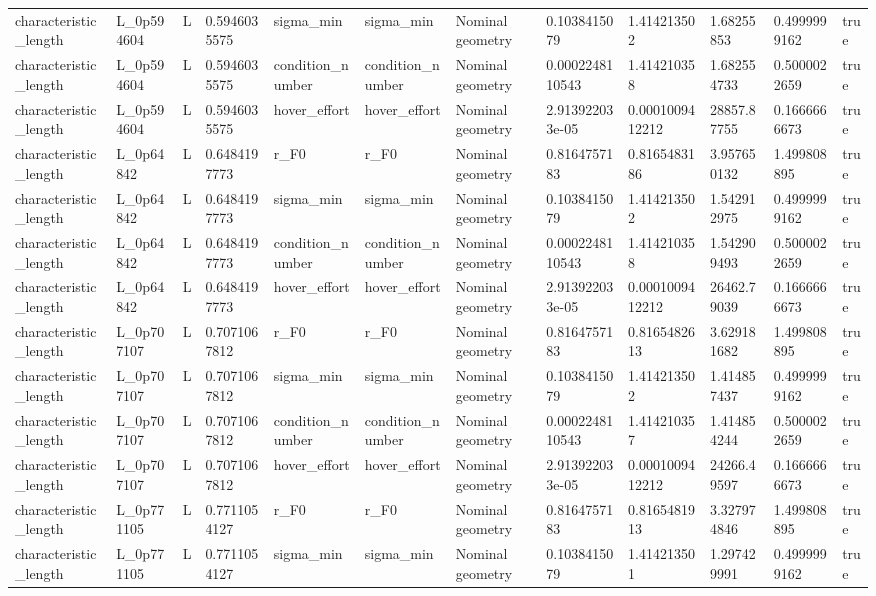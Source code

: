 \begin{tabular}{@{}llllllllllll@{}}
characteristic\_length & L\_0p594604 & L & 0.5946035575 & sigma\_min & sigma\_min & Nominal geometry & 0.1038415079 & 1.414213502 & 1.68255853 & 0.4999999162 & true \\
characteristic\_length & L\_0p594604 & L & 0.5946035575 & condition\_number & condition\_number & Nominal geometry & 0.0002248110543 & 1.414210358 & 1.682554733 & 0.5000022659 & true \\
characteristic\_length & L\_0p594604 & L & 0.5946035575 & hover\_effort & hover\_effort & Nominal geometry & 2.913922033e-05 & 0.0001009412212 & 28857.87755 & 0.1666666673 & true \\
characteristic\_length & L\_0p64842 & L & 0.6484197773 & r\_F0 & r\_F0 & Nominal geometry & 0.8164757183 & 0.8165483186 & 3.957650132 & 1.499808895 & true \\
characteristic\_length & L\_0p64842 & L & 0.6484197773 & sigma\_min & sigma\_min & Nominal geometry & 0.1038415079 & 1.414213502 & 1.542912975 & 0.4999999162 & true \\
characteristic\_length & L\_0p64842 & L & 0.6484197773 & condition\_number & condition\_number & Nominal geometry & 0.0002248110543 & 1.414210358 & 1.542909493 & 0.5000022659 & true \\
characteristic\_length & L\_0p64842 & L & 0.6484197773 & hover\_effort & hover\_effort & Nominal geometry & 2.913922033e-05 & 0.0001009412212 & 26462.79039 & 0.1666666673 & true \\
characteristic\_length & L\_0p707107 & L & 0.7071067812 & r\_F0 & r\_F0 & Nominal geometry & 0.8164757183 & 0.8165482613 & 3.629181682 & 1.499808895 & true \\
characteristic\_length & L\_0p707107 & L & 0.7071067812 & sigma\_min & sigma\_min & Nominal geometry & 0.1038415079 & 1.414213502 & 1.414857437 & 0.4999999162 & true \\
characteristic\_length & L\_0p707107 & L & 0.7071067812 & condition\_number & condition\_number & Nominal geometry & 0.0002248110543 & 1.414210357 & 1.414854244 & 0.5000022659 & true \\
characteristic\_length & L\_0p707107 & L & 0.7071067812 & hover\_effort & hover\_effort & Nominal geometry & 2.913922033e-05 & 0.0001009412212 & 24266.49597 & 0.1666666673 & true \\
characteristic\_length & L\_0p771105 & L & 0.7711054127 & r\_F0 & r\_F0 & Nominal geometry & 0.8164757183 & 0.8165481913 & 3.327974846 & 1.499808895 & true \\
characteristic\_length & L\_0p771105 & L & 0.7711054127 & sigma\_min & sigma\_min & Nominal geometry & 0.1038415079 & 1.414213501 & 1.297429991 & 0.4999999162 & true \\

\end{tabular}
